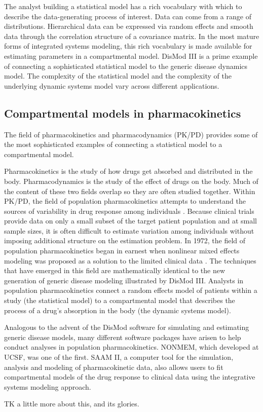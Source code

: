 The analyst building a statistical model has a rich vocabulary with
which to describe the data-generating process of interest. Data can
come from a range of distributions. Hierarchical data can be expressed
via random effects and smooth data through the correlation structure
of a covariance matrix. In the most mature forms of integrated systems
modeling, this rich vocabulary is made available for estimating
parameters in a compartmental model. DisMod III is a prime example of
connecting a sophisticated statistical model to the generic disease
dynamics model. The complexity of the statistical model and the
complexity of the underlying dynamic systems model vary across
different applications.

\subsection{Compartmental models in pharmacokinetics}
The field of pharmacokinetics and pharmacodynamics (PK/PD) provides
some of the most sophisticated examples of connecting a statistical
model to a compartmental model.

Pharmacokinetics is the study of how drugs get absorbed and
distributed in the body. Pharmacodynamics is the study of the effect
of drugs on the body. Much of the content of these two fields overlap
so they are often studied together. Within PK/PD, the field of
population pharmacokinetics attempts to understand the sources of
variability in drug response among individuals
\cite{Yuh_Population_1994}. Because clinical trials provide data on
only a small subset of the target patient population and at small
sample sizes, it is often difficult to estimate variation among
individuals without imposing additional structure on the estimation
problem. In 1972, the field of population pharmacokinetics began in
earnest when nonlinear mixed effects modeling was proposed as a
solution to the limited clinical data
\cite{Sheiner_Modelling_1972}. The techniques that have emerged in
this field are mathematically identical to the new generation of
generic disease modeling illustrated by DisMod III. Analysts in
population pharmacokinetics connect a random effects model of patients
within a study (the statistical model) to a compartmental model that
describes the process of a drug's absorption in the body (the dynamic
systems model).

Analogous to the advent of the DisMod software for simulating and
estimating generic disease models, many different software packages
have arisen to help conduct analyses in population
pharmacokinetics. NONMEM, which developed at UCSF, was one of the
first.\cite{Beal_NONMEM_2009} SAAM II, a computer tool for the
simulation, analysis and modeling of pharmacokinetic data, also allows
users to fit compartmental models of the drug response to clinical
data using the integrative systems modeling
approach.\cite{Barrett_SAAM_1998}

TK a little more about this, and its glories.




